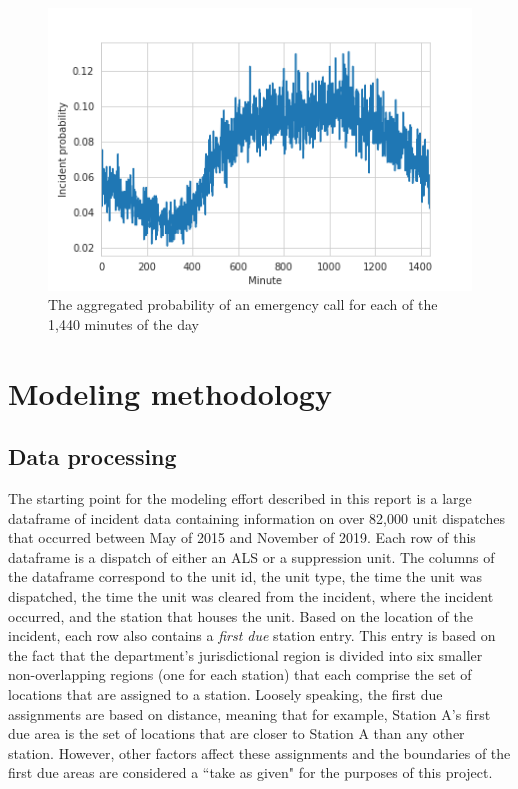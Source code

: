 \documentclass[article]{proc}
\begin{document}
\begin{figure}[!htb]
  \centering
  \includegraphics[width=12cm,keepaspectratio]{Figures/raw_signal.png}
  \caption{The aggregated probability of an emergency call for each of the 1,440 minutes of the day}
  \label{fig:raw_signal}
\end{figure}



\section{Modeling methodology}
\subsection{Data processing}
The starting point for the modeling effort described in this report is a large dataframe of incident data containing information on over 82,000 unit dispatches that occurred between May of 2015 and November of 2019. Each row of this dataframe is a dispatch of either an ALS or a suppression unit. The columns of the dataframe correspond to the unit id, the unit type, the time the unit was dispatched, the time the unit was cleared from the incident, where the incident occurred, and the station that houses the unit. Based on the location of the incident, each row also contains a \textit{first due} station entry. This entry is based on the fact that the department's jurisdictional region is divided into six smaller non-overlapping regions (one for each station) that each comprise the set of locations that are assigned to a station. Loosely speaking, the first due assignments are based on distance, meaning that for example, Station A's first due area is the set of locations that are closer to Station A than any other station. However, other factors affect these assignments and the boundaries of the first due areas are considered a ``take as given" for the purposes of this project.
\end{document}
